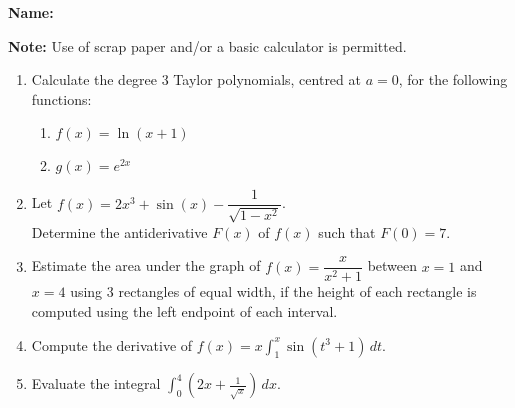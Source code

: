\documentclass[12pt]{article}
\newcommand{\points}[1]{\marginpar{\hspace{24pt}[#1]}}
\newcommand{\di}{\displaystyle}
\begin{document}
{\bf \large Name:} \hspace{2.5in} 

\bigskip

{\bf Note:} Use of scrap paper and/or a basic calculator is permitted.

\thispagestyle{fancy}

 \begin{enumerate}
 \item  Calculate the degree 3 Taylor polynomials, centred at $a=0$, for the following functions:
\begin{enumerate}
 \item $f(x) = \ln(x+1)$ \points{3}

\vspace{2in}

 \item $g(x) = e^{2x}$ \points{3}

\vspace{2in}

\end{enumerate}

\item Let $f(x) = 2x^3+\sin(x)-\dfrac{1}{\sqrt{1-x^2}}$. \points{2}\\
Determine the antiderivative $F(x)$ of $f(x)$ such that $F(0)=7$. 

\newpage

\item Estimate the area under the graph of $f(x) = \dfrac{x}{x^2+1}$ between $x=1$ and $x=4$ using 3 rectangles of equal width, if the height of each rectangle is computed using the left endpoint of each interval. \points{3}

\vspace{3.5in}

\item Compute the derivative of $\di f(x) = x\int_1^{x} \sin(t^3+1)\,dt$. \points{2}

\vspace{2in}

\item Evaluate the integral $\di \int_0^4 \left(2x+\frac{1}{\sqrt{x}}\right)\,dx$. \points{3}
\end{enumerate}
\end{document}
